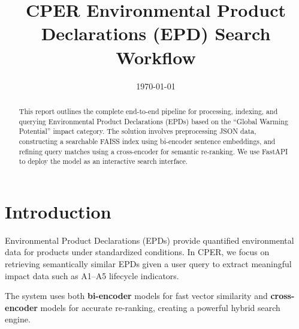 \documentclass[11pt]{article}
\title{CPER Environmental Product Declarations (EPD) Search Workflow}
\date{\today}
\begin{document}
\maketitle

\begin{abstract}
This report outlines the complete end-to-end pipeline for processing, indexing, and querying Environmental Product Declarations (EPDs) based on the ``Global Warming Potential'' impact category. The solution involves preprocessing JSON data, constructing a searchable FAISS index using bi-encoder sentence embeddings, and refining query matches using a cross-encoder for semantic re-ranking. We use FastAPI to deploy the model as an interactive search interface.
\end{abstract}

\section{Introduction}
Environmental Product Declarations (EPDs) provide quantified environmental data for products under standardized conditions. In CPER, we focus on retrieving semantically similar EPDs given a user query to extract meaningful impact data such as A1–A5 lifecycle indicators.

The system uses both \textbf{bi-encoder} models for fast vector similarity and \textbf{cross-encoder} models for accurate re-ranking, creating a powerful hybrid search engine.
\end{document}
